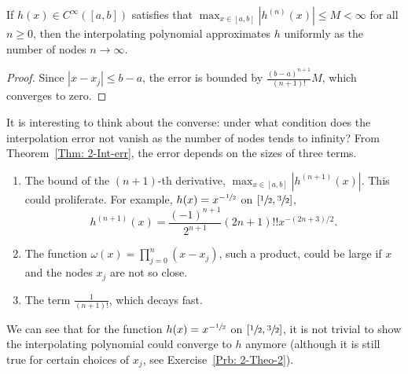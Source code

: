 \begin{corollary}
    If $h(x)\in C^{\infty}([a, b])$ satisfies that $\max_{x\in[a,b]} |h^{(n)}(x)|\le M <\infty$ for all $n\ge 0$, then the interpolating polynomial approximates $h$ uniformly as the number of nodes $n\to \infty$.
\end{corollary}
\begin{proof}
    Since $|x -x_j|\le b-a$, the error is bounded by $\frac{(b-a)^{n+1}}{(n+1)!} M$, which converges to zero.
\end{proof}
It is interesting to think about the converse: under what condition does the interpolation error not vanish as the number of nodes tends to infinity? From Theorem~\ref{Thm: 2-Int-err}, the error depends on the sizes of three terms. 
\begin{enumerate}
    \item The bound of the $(n+1)$-th derivative, $\max_{x\in[a,b]}|h^{(n+1)}(x)|$. This could proliferate. For example, $h(x) = x^{-\sfrac{1}{2}}$ on $[\sfrac{1}{2}, \sfrac{3}{2}]$,
    \begin{equation}
         h^{(n+1)}(x) = \frac{(-1)^{n+1}}{2^{n+1}} (2n+1)!! x^{-(2n+3)/2}.
    \end{equation}
    \item The function $\omega(x) = \prod_{j=0}^n (x - x_j)$, such a product, could be large if $x$ and the nodes $x_j$ are not so close.
    \item The term $\frac{1}{(n+1)!}$, which decays fast.
\end{enumerate}
We can see that for the function $h(x) = x^{-\sfrac{1}{2}}$ on $[\sfrac{1}{2}, \sfrac{3}{2}]$, it is not trivial to show the interpolating polynomial could converge to $h$ anymore (although it is still true for certain choices of $x_j$, see Exercise~\ref{Prb: 2-Theo-2}). 

